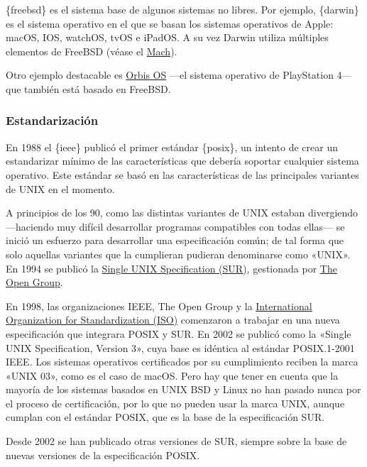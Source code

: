 \{freebsd\} es el sistema base de algunos sistemas no libres. Por
ejemplo, \{darwin\} es el sistema operativo en el que se basan los
sistemas operativos de Apple: macOS, IOS, watchOS, tvOS e iPadOS. A su
vez Darwin utiliza múltiples elementos de FreeBSD (véase el
\hyperref[_mach]{Mach}).

Otro ejemplo destacable es
\href{https://en.wikipedia.org/wiki/PlayStation_4_system_software}{Orbis
OS} ---el sistema operativo de PlayStation 4--- que también está basado
en FreeBSD.

\subsubsection{Estandarización}\label{_estandarizaciuxf3n}

En 1988 el \{ieee\} publicó el primer estándar \{posix\}, un intento de
crear un estandarizar mínimo de las características que debería soportar
cualquier sistema operativo. Este estándar se basó en las
características de las principales variantes de UNIX en el momento.

A principios de los 90, como las distintas variantes de UNIX estaban
divergiendo ---haciendo muy difícil desarrollar programas compatibles
con todas ellas--- se inició un esfuerzo para desarrollar una
especificación común; de tal forma que solo aquellas variantes que la
cumplieran pudieran denominarse como «UNIX». En 1994 se publicó la
\href{https://es.wikipedia.org/wiki/Single_Unix_Specification}{Single
UNIX Specification (SUR)}, gestionada por
\href{https://es.wikipedia.org/wiki/The_Open_Group}{The Open Group}.

En 1998, las organizaciones IEEE, The Open Group y la
\href{https://en.wikipedia.org/wiki/International_Organization_for_Standardization}{International
Organization for Standardization (ISO)} comenzaron a trabajar en una
nueva especificación que integrara POSIX y SUR. En 2002 se publicó como
la «Single UNIX Specification, Version 3», cuya base es idéntica al
estándar POSIX.1-2001 IEEE. Los sistemas operativos certificados por su
cumplimiento reciben la marca «UNIX 03», como es el caso de macOS. Pero
hay que tener en cuenta que la mayoría de los sistemas basados en UNIX
BSD y Linux no han pasado nunca por el proceso de certificación, por lo
que no pueden usar la marca UNIX, aunque cumplan con el estándar POSIX,
que es la base de la especificación SUR.

Desde 2002 se han publicado otras versiones de SUR, siempre sobre la
base de nuevas versiones de la especificación POSIX.

